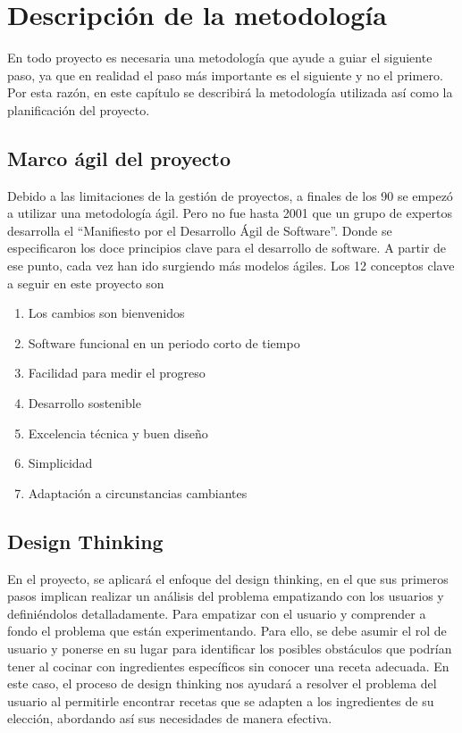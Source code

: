 \chapter{Descripción de la metodología}
En todo proyecto es necesaria una metodología que ayude a guiar el siguiente paso, ya que en realidad el paso más importante es el siguiente y no el primero. Por esta razón, en este capítulo se describirá la metodología utilizada así como la planificación del proyecto.

\section{Marco ágil del proyecto}
Debido a las limitaciones de la gestión de proyectos, a finales de los 90 se empezó a utilizar una metodología ágil. Pero no fue hasta 2001 que un grupo de expertos desarrolla el ``Manifiesto por el Desarrollo Ágil de Software''. Donde se especificaron los doce principios clave para el desarrollo de software. A partir de ese punto, cada vez han ido surgiendo más modelos ágiles. Los 12 conceptos clave\cite{OBS2016} a seguir en este proyecto son\:
\begin{enumerate}
    \item Los cambios son bienvenidos
    \item Software funcional en un periodo corto de tiempo
    \item Facilidad para medir el progreso
    \item Desarrollo sostenible
    \item Excelencia técnica y buen diseño
    \item Simplicidad
    \item Adaptación a circunstancias cambiantes
\end{enumerate}

\section{Design Thinking}
En el proyecto, se aplicará el enfoque del \gls{design thinking}, en el que sus primeros pasos implican realizar un análisis del problema empatizando con los usuarios y definiéndolos detalladamente. Para empatizar con el usuario y comprender a fondo el problema que están experimentando. Para ello, se debe asumir el rol de usuario y ponerse en su lugar para identificar los posibles obstáculos que podrían tener al cocinar con ingredientes específicos sin conocer una receta adecuada. En este caso, el proceso de \gls{design thinking} nos ayudará a resolver el problema del usuario al permitirle encontrar recetas que se adapten a los ingredientes de su elección, abordando así sus necesidades de manera efectiva.


